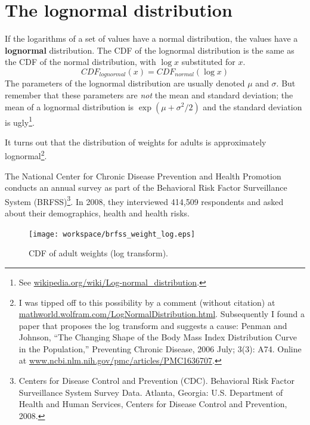 \documentclass[12pt]{book}
\begin{document}
\section{The lognormal distribution}
\label{lognormal}

If the logarithms of a set of values have a normal distribution, the
values have a {\bf lognormal} distribution.  The CDF of the lognormal
distribution is the same as the CDF of the normal distribution,
with $\log x$ substituted for $x$.
%
\[ CDF_{lognormal}(x) = CDF_{normal}(\log x) \]
%
The parameters of the lognormal distribution are usually denoted $\mu$
and $\sigma$.  But remember that these parameters are {\em not} the
mean and standard deviation; the mean of a lognormal distribution is
$\exp(\mu + \sigma^2/2)$ and the standard deviation is
ugly\footnote{See \url{wikipedia.org/wiki/Log-normal_distribution}.}.


It turns out that the distribution of weights for adults is
approximately lognormal\footnote{I was tipped off to this possibility by a
  comment (without citation) at
  \url{mathworld.wolfram.com/LogNormalDistribution.html}.
  Subsequently I found a paper that proposes the log transform and
  suggests a cause: Penman and Johnson, ``The Changing Shape of the
  Body Mass Index Distribution Curve in the Population,'' Preventing
  Chronic Disease, 2006 July; 3(3): A74.  Online
  at \url{www.ncbi.nlm.nih.gov/pmc/articles/PMC1636707}.}.

The National Center for Chronic Disease
Prevention and Health Promotion conducts an annual survey as part of
the Behavioral Risk Factor Surveillance System
(BRFSS)\footnote{Centers for Disease Control and Prevention
  (CDC). Behavioral Risk Factor Surveillance System Survey
  Data. Atlanta, Georgia: U.S. Department of Health and Human
  Services, Centers for Disease Control and Prevention, 2008.}.  In
2008, they interviewed 414,509 respondents and asked about their
demographics, health and health risks.



\begin{figure}
\centerline{
\texttt{[image: workspace/brfss\_weight\_log.eps]}
}
\caption{CDF of adult weights (log
  transform).}
\label{brfss_weight_log}
\end{figure}
\end{document}
